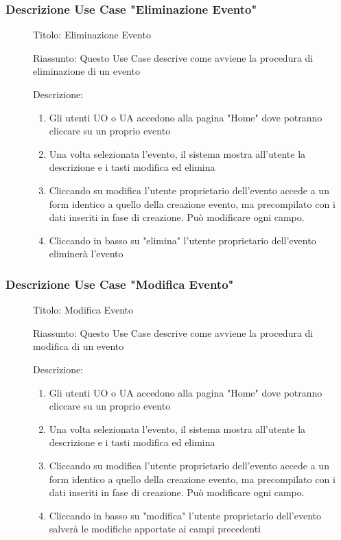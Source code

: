 \documentclass{article}
\begin{document}
\subsubsection*{Descrizione Use Case "Eliminazione Evento"}
\begin{description}
    \item[] Titolo: Eliminazione Evento
    \item[] Riassunto: Questo Use Case descrive come avviene la procedura di eliminazione di un evento
    \item[] Descrizione:
        \begin{enumerate}
            \item Gli utenti UO o UA accedono alla pagina "Home" dove potranno cliccare su un proprio evento
            \item Una volta selezionata l'evento, il sistema mostra all'utente la descrizione e i tasti modifica ed elimina
            \item Cliccando su modifica l'utente proprietario dell'evento accede a un form identico a quello della creazione evento, ma precompilato con i dati inseriti in fase di creazione. Può modificare ogni campo.
            \item Cliccando in basso su "elimina" l'utente proprietario dell'evento eliminerà l'evento
        \end{enumerate}
\end{description}
\subsubsection*{Descrizione Use Case "Modifica Evento"}
\begin{description}
    \item[] Titolo: Modifica Evento
    \item[] Riassunto: Questo Use Case descrive come avviene la procedura di modifica di un evento
    \item[] Descrizione:
        \begin{enumerate}
            \item Gli utenti UO o UA accedono alla pagina "Home" dove potranno cliccare su un proprio evento
            \item Una volta selezionata l'evento, il sistema mostra all'utente la descrizione e i tasti modifica ed elimina
            \item Cliccando su modifica l'utente proprietario dell'evento accede a un form identico a quello della creazione evento, ma precompilato con i dati inseriti in fase di creazione. Può modificare ogni campo.
            \item Cliccando in basso su "modifica" l'utente proprietario dell'evento salverà le modifiche apportate ai campi precedenti
        \end{enumerate}
\end{description}
\clearpage
\end{document}
